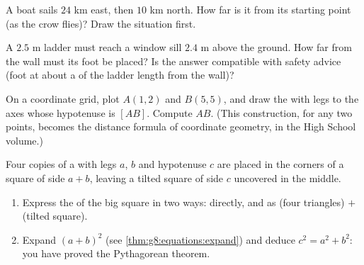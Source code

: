 \begin{exercise}[$\star\star$]\label{exo:g8:pythagoras:8}
A boat sails $24$ km east, then $10$ km north. How far is it from its
starting point (as the crow flies)? Draw the situation first.
\end{exercise}

\begin{exercise}[$\star\star$]\label{exo:g8:pythagoras:9}
A $2.5$ m ladder must reach a window sill $2.4$ m above the ground.
How far from the wall must its foot be placed? Is the answer
compatible with safety advice (foot at about a  of the ladder
length from the wall)?
\end{exercise}

\begin{exercise}[$\star\star$]\label{exo:g8:pythagoras:10}
On a coordinate grid, plot $A(1, 2)$ and $B(5, 5)$, and draw the
 with legs  to the axes whose hypotenuse is
$[AB]$. Compute $AB$. (This construction, for any two points, becomes
the distance formula of coordinate geometry, in the High School
volume.)
\end{exercise}

\begin{exercise}[$\star\star\star$]\label{exo:g8:pythagoras:11}
Four copies of a  with legs $a$, $b$ and hypotenuse $c$
are placed in the corners of a square of side $a + b$, leaving a
tilted square of side $c$ uncovered in the middle.
\begin{enumerate}
  \item Express the  of the big square in two ways: directly, and
        as (four triangles) $+$ (tilted square).
  \item Expand $(a + b)^2$ (see \cref{thm:g8:equations:expand}) and
        deduce $c^2 = a^2 + b^2$: you have proved the Pythagorean
        theorem.
\end{enumerate}
\end{exercise}
